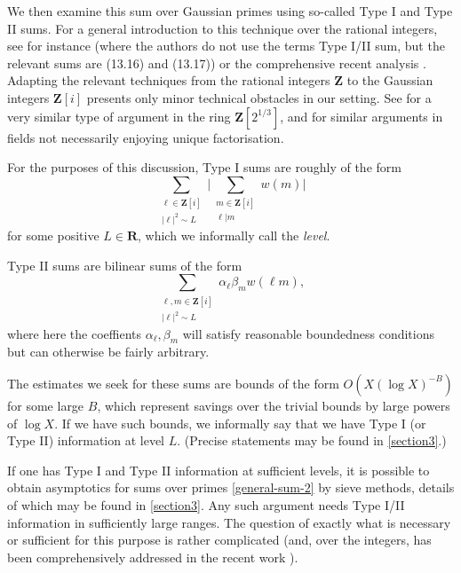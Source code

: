 \documentclass[11pt,reqno]{amsart}
\numberwithin{equation}{section}
\theoremstyle{definition}
\theoremstyle{remark}
\newcommand\Z{\mathbf{Z}}
\newcommand\R{\mathbf{R}}
\begin{document}
We then examine this sum over Gaussian primes using so-called Type I and Type II sums.  For a general introduction to this technique over the rational integers, see for instance \cite[Chapter 13]{IK-book} (where the authors do not use the terms Type I/II sum, but the relevant sums are (13.16) and (13.17)) or the comprehensive recent analysis \cite{FM24}. Adapting the relevant techniques from the rational integers $\Z$ to the Gaussian integers $\Z[i]$ presents only minor technical obstacles in our setting. See \cite[Section 3]{HB01} for a very similar type of argument in the ring $\Z[2^{1/3}]$, and \cite{hb-moroz,maynard-norm-forms} for similar arguments in fields not necessarily enjoying unique factorisation. 

For the purposes of this discussion, Type I sums are roughly of the form
\begin{equation}\label{typei-def} \sum_{\substack{\ell \in \Z[i] \\ |\ell|^2 \sim L}} \Big| \sum_{\substack{m \in \Z[i] \\ \ell | m}} w(m) \Big|\end{equation} for some positive $L \in \R$, which we informally call the \emph{level}.

Type II sums are bilinear sums of the form 
\begin{equation}\label{typeii-def}\sum_{\substack{\ell, m\in \Z[i]\\ |\ell|^2\sim L}} \alpha_{\ell} \beta_m w(\ell m),\end{equation} where here the coeffients $\alpha_{\ell}, \beta_m$ will satisfy reasonable boundedness conditions but can otherwise be fairly arbitrary.

The estimates we seek for these sums are bounds of the form $O(X (\log X)^{-B})$ for some large $B$, which represent savings over the trivial bounds by large powers of $\log X$. If we have such bounds, we informally say that we have Type I (or Type II) information at level $L$. (Precise statements may be found in \cref{section3}.)

If one has Type I and Type II information at sufficient levels, it is possible to obtain asymptotics for sums over primes \cref{general-sum-2} by sieve methods, details of which may be found in \cref{section3}. Any such argument needs Type I/II information in sufficiently large ranges. The question of exactly what is necessary or sufficient for this purpose is rather complicated (and, over the integers, has been comprehensively addressed in the recent work \cite{FM24}). 
\end{document}
